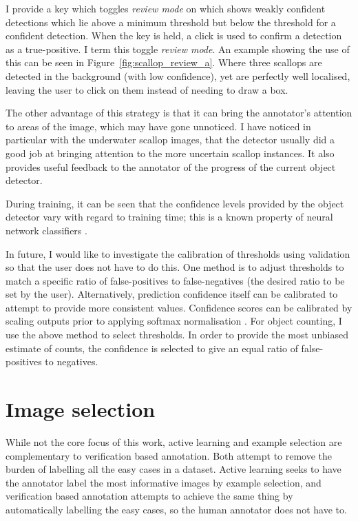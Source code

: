 I provide a key which toggles \emph{review mode} on which shows weakly confident detections which lie above a minimum threshold but below the threshold for a confident detection. When the key is held, a click is used to confirm a detection as a true-positive. I term this toggle \emph{review mode}.  An example showing the use of this can be seen in Figure~\ref{fig:scallop_review_a}. Where three scallops are detected in the background (with low confidence), yet are perfectly well localised, leaving the user to click on them instead of needing to draw a box.

The other advantage of this strategy is that it can bring the annotator's attention to areas of the image, which may have gone unnoticed. I have noticed in particular with the underwater scallop images, that the detector usually did a good job at bringing attention to the more uncertain scallop instances. It also provides useful feedback to the annotator of the progress of the current object detector. 

During training, it can be seen that the confidence levels provided by the object detector vary with regard to training time; this is a known property of neural network classifiers \cite{Guo2017}.

In future, I would like to investigate the calibration of thresholds using validation so that the user does not have to do this. One method is to adjust thresholds to match a specific ratio of false-positives to false-negatives (the desired ratio to be set by the user). Alternatively, prediction confidence itself can be calibrated to attempt to provide more consistent values. Confidence scores can be calibrated by scaling outputs prior to applying softmax normalisation \cite{Guo2017}. For object counting, I use the above method to select thresholds. In order to provide the most unbiased estimate of counts, the confidence is selected to give an equal ratio of false-positives to negatives.
 
\section{Image selection}
\label{sec:example_selection}

While not the core focus of this work, active learning and example selection are complementary to verification based annotation. Both attempt to remove the burden of labelling all the easy cases in a dataset. Active learning seeks to have the annotator label the most informative images by example selection, and verification based annotation attempts to achieve the same thing by automatically labelling the easy cases, so the human annotator does not have to. 

